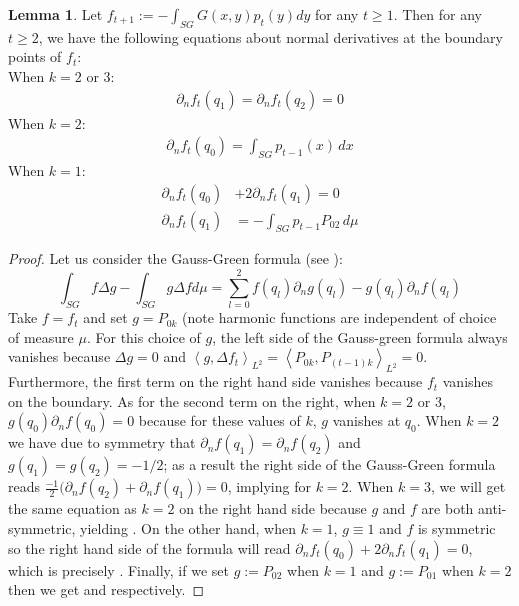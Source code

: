 \documentclass[12pt]{amsart}
\makeatletter
\renewcommand*{\eqref}[1]{%
  \hyperref[{#1}]{\textup{\tagform@{\ref*{#1}}}}%
}
\theoremstyle{plain}
\theoremstyle{definition}
\newtheorem{lemma}{Lemma}[section]
\newcommand{\inner}[2]{\left \langle #1, #2\right \rangle}
\newcommand{\lap}{\Delta}
\makeatother
\begin{document}
\begin{lemma}\label{Lemma: Expansions for f}
Let $f_{t+1} := -\int_{SG}G(x,y)p_{t}(y)dy$ for any $t\geq 1$. Then for any $t \geq 2$, we have the following equations about normal derivatives at the boundary points of $f_t$:\\
When $k = 2$ or $3$:
\begin{align}
    \partial_n f_t(q_1)=\partial_n f_t(q_2)=0 \label{dnftfor2or3atq1}
\end{align}
When $k=2$:
\begin{gather}
    \partial_n f_t(q_0)=\int_{SG}p_{t-1}(x)\,dx \label{dnftfor2atq0}
\end{gather}
When $k = 1$:
\begin{align}
\partial_n f_t(q_0)&+2\partial_n f_t(q_1)=0 \label{dnftfor1atq0q1}\\
\partial_n f_t(q_1)&=-\int_{SG}p_{t-1}P_{02}\,d\mu \label{dnftfor1atq1}   
\end{align}
\end{lemma}
\begin{proof}
Let us consider the Gauss-Green formula (see \cite{S}): $$\int _{SG}f\lap g-\int_{SG}g\lap f
d\mu=\sum\limits_{l=0}^{2}f(q_l)\partial_n g(q_l)-g(q_l)\partial_n f(q_l)$$ Take $f=f_t$ and set
$g=P_{0k}$ (note harmonic functions are independent of choice of measure $\mu$. For this choice of $g$, the left side of the Gauss-green formula always vanishes because $\Delta g=0$ and $\inner{g}{\Delta f_t}_{L^2} = \inner{P_{0k}}{P_{(t-1)k}}_{L^2} = 0$. Furthermore, the first term on the right hand side vanishes because $f_t$ vanishes on the boundary. As for the second term on the right, when $k=2$ or $3$, $g(q_0)\partial_n f(q_0) = 0$ because for these values of $k$, $g$ vanishes at $q_0$. When $k = 2$ we have due to symmetry that $\partial_n f(q_1) = \partial_n f(q_2)$ and $g(q_1) = g(q_2) = -1/2$; as a result the right side of the Gauss-Green formula reads $\frac{-1}{2}\Big(\partial_n f(q_2) + \partial_n f(q_1)\Big) = 0$, implying \eqref{dnftfor2or3atq1} for $k=2$. When $k=3$, we will get the same equation as $k=2$ on the right hand side because $g$ and $f$ are both anti-symmetric, yielding \eqref{dnftfor2or3atq1}. On the other hand, when $k=1$, $g \equiv 1$ and $f$ is symmetric so the right hand side of the formula will read $\partial_n f_t(q_0)+2\partial_n f_t(q_1)=0$, which is precisely \eqref{dnftfor1atq0q1}. Finally, if we set $g:= P_{02}$ when $k=1$ and $g:= P_{01}$ when $k=2$ then we get \eqref{dnftfor1atq1} and \eqref{dnftfor2atq0} respectively.
\end{proof}
\end{document}
